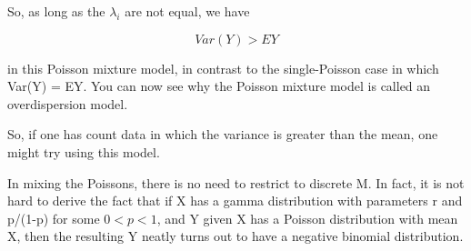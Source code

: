 \documentclass[11pt]{article}
\begin{document}
So, as long as the $\lambda_i$ are not equal, we have

\begin{equation}
Var(Y) > EY
\end{equation}

in this Poisson mixture model, in contrast to the single-Poisson case
in which Var(Y) = EY.  You can now see why the Poisson mixture model is
called an overdispersion model.

So, if one has count data in which the variance is greater than the
mean, one might try using this model.

In mixing the Poissons, there is no need to restrict to discrete M.  In
fact, it is not hard to derive the fact that if X has a gamma
distribution with parameters r and p/(1-p) for some $0 < p < 1$, and Y
given X has a Poisson distribution with mean X, then the resulting Y
neatly turns out to have a negative binomial distribution.


% 
% 
% 
% 
% 

% 
% 
\end{document}

